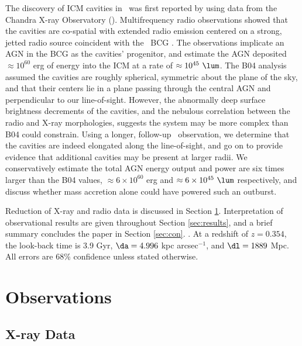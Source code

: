 \documentclass[iop]{emulateapj-rtx4}
\begin{document}
The discovery of ICM cavities in \rbs\ was first reported by
\citet{schindler01} using data from the Chandra X-ray Observatory
(\cxo). Multifrequency radio observations showed that the cavities are
co-spatial with extended radio emission centered on a strong, jetted
radio source coincident with the \rbs\ BCG \citep{2002astro.ph..1349D,
  gitti06, birzan08}. The observations implicate an AGN in the BCG as
the cavities' progenitor, and \citet[][hereafter B04]{birzan04}
estimate the AGN deposited $\approx 10^{60}$ erg of energy into the
ICM at a rate of $\approx 10^{45} ~\lum$. The B04 analysis assumed the
cavities are roughly spherical, symmetric about the plane of the sky,
and that their centers lie in a plane passing through the central AGN
and perpendicular to our line-of-sight. However, the abnormally deep
surface brightness decrements of the cavities, and the nebulous
correlation between the radio and X-ray morphologies, suggests the
system may be more complex than B04 could constrain. Using a longer,
follow-up \cxo\ observation, we determine that the cavities are indeed
elongated along the line-of-sight, and go on to provide evidence that
additional cavities may be present at larger radii. We conservatively
estimate the total AGN energy output and power are six times larger
than the B04 values, $\approx 6 \times 10^{60}$ erg and $\approx 6
\times 10^{45} ~\lum$ respectively, and discuss whether mass accretion
alone could have powered such an outburst.

Reduction of X-ray and radio data is discussed in Section
\ref{sec:obs}. Interpretation of observational results are given
throughout Section \ref{sec:results}, and a brief summary concludes
the paper in Section \ref{sec:con}. \LCDM. At a redshift of $z =
0.354$, the look-back time is 3.9 Gyr, $\da = 4.996$ kpc
arcsec$^{-1}$, and $\dl = 1889$ Mpc. All errors are 68\% confidence
unless stated otherwise.

\section{Observations}
\label{sec:obs}

\subsection{X-ray Data}
\label{sec:xray}
\end{document}
